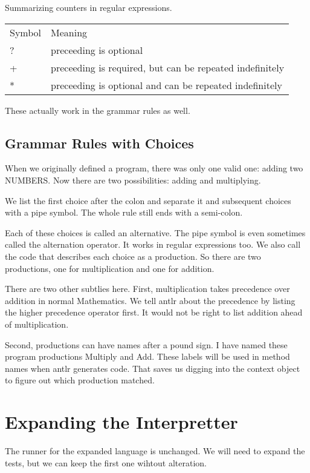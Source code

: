 Summarizing counters in regular expressions.

\begin{tabular}{l l}
    Symbol &    Meaning \\
    ?      &    preceeding is optional \\
    +      &    preceeding is required, but can be repeated indefinitely \\
    *      &    preceeding is optional and can be repeated indefinitely \\
\end{tabular}

These actually work in the grammar rules as well.

\subsection{Grammar Rules with Choices}

When we originally defined a program, there was only one valid one:
adding two NUMBERS. Now there are two possibilities: adding and multiplying.

We list the first choice after the colon and separate it and subsequent
choices with a pipe symbol. The whole rule still ends with a semi-colon.

Each of these choices is called an alternative. The pipe symbol is
even sometimes called the alternation operator. It works in regular
expressions too. We also call the code that describes each choice as
a production. So there are two productions, one for multiplication
and one for addition.

There are two other subtlies here. First, multiplication takes precedence
over addition in normal Mathematics. We tell antlr about the precedence
by listing the higher precedence operator first. It would not be right
to list addition ahead of multiplication.

Second, productions can have names after a pound sign. I have named
these program productions Multiply and Add. These labels will be used
in method names when antlr generates code. That saves us digging into
the context object to figure out which production matched.

\section{Expanding the Interpretter}

The runner for the expanded language is unchanged. We will need to expand
the tests, but we can keep the first one wihtout alteration.

